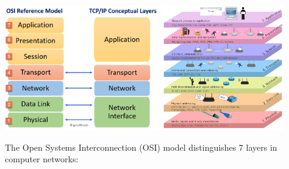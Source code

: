 \includegraphics[width=0.5\textwidth,height=0.3\textheight]{notes/../figures/osi-model-2.png}
\includegraphics[width=0.4\textwidth,height=0.3\textheight]{notes/../figures/osi-model-1.png}

The Open Systems Interconnection (OSI) model distinguishes 7 layers in
computer networks:

